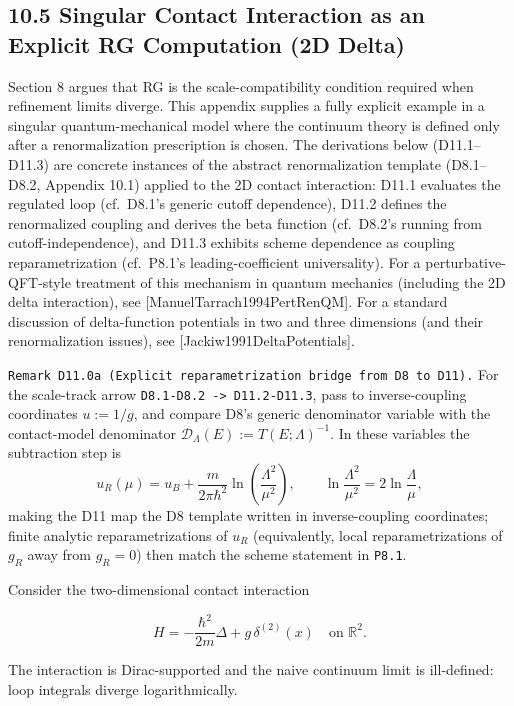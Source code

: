 \documentclass[
]{article}
\begin{document}
\subsection{10.5 Singular Contact Interaction as an Explicit RG
Computation (2D
Delta)}\label{singular-contact-interaction-as-an-explicit-rg-computation-2d-delta}

Section 8 argues that RG is the scale-compatibility condition required
when refinement limits diverge. This appendix supplies a fully explicit
example in a singular quantum-mechanical model where the continuum
theory is defined only after a renormalization prescription is chosen.
The derivations below (D11.1--D11.3) are concrete instances of the
abstract renormalization template (D8.1--D8.2, Appendix 10.1) applied to
the 2D contact interaction: D11.1 evaluates the regulated loop
(cf.~D8.1's generic cutoff dependence), D11.2 defines the renormalized
coupling and derives the beta function (cf.~D8.2's running from
cutoff-independence), and D11.3 exhibits scheme dependence as coupling
reparametrization (cf.~P8.1's leading-coefficient universality). For a
perturbative-QFT-style treatment of this mechanism in quantum mechanics
(including the 2D delta interaction), see
{[}ManuelTarrach1994PertRenQM{]}. For a standard discussion of
delta-function potentials in two and three dimensions (and their
renormalization issues), see {[}Jackiw1991DeltaPotentials{]}.

\texttt{Remark\ D11.0a\ (Explicit\ reparametrization\ bridge\ from\ D8\ to\ D11).}
For the scale-track arrow
\texttt{D8.1-D8.2\ -\textgreater{}\ D11.2-D11.3}, pass to
inverse-coupling coordinates \(u:=1/g\), and compare D8's generic
denominator variable with the contact-model denominator
\(\mathcal D_\Lambda(E):=T(E;\Lambda)^{-1}\). In these variables the
subtraction step is \[
u_R(\mu)=u_B+\frac{m}{2\pi\hbar^2}\ln\!\left(\frac{\Lambda^2}{\mu^2}\right),\qquad \ln\!\frac{\Lambda^2}{\mu^2}=2\ln\!\frac{\Lambda}{\mu},
\] making the D11 map the D8 template written in inverse-coupling
coordinates; finite analytic reparametrizations of \(u_R\)
(equivalently, local reparametrizations of \(g_R\) away from \(g_R=0\))
then match the scheme statement in \texttt{P8.1}.

Consider the two-dimensional contact interaction

\[
H
=
-\frac{\hbar^2}{2m}\Delta
+g\,\delta^{(2)}(x)
\quad \text{on }\mathbb R^2.
\]

The interaction is Dirac-supported and the naive continuum limit is
ill-defined: loop integrals diverge logarithmically.
\end{document}
